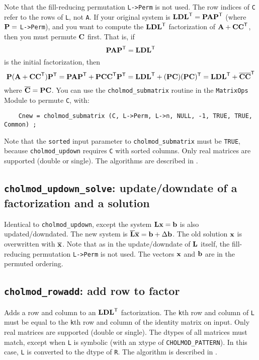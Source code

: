 \documentclass[11pt]{article}
\newcommand{\m}[1]{{\bf{#1}}}       %
\newcommand{\tr}{^{\sf T}}          %
\newcommand{\new}[1]{\overline{#1}}
\begin{document}
Note that the fill-reducing permutation {\tt L->Perm} is not used.  The row
indices of {\tt C} refer to the rows of {\tt L}, not {\tt A}.  If your original
system is $\m{LDL}\tr = \m{PAP}\tr$ (where $\m{P} =$ {\tt L->Perm}), and you
want to compute the $\m{LDL}\tr$ factorization of $\m{A}+\m{CC}\tr$, then you
must permute $\m{C}$ first.  That is, if
\[
    \m{PAP}\tr = \m{LDL}\tr
\]
is the initial factorization, then
\[
\m{P}(\m{A}+\m{CC}\tr)\m{P}\tr
    = \m{PAP}\tr+\m{PCC}\tr\m{P}\tr
    = \m{LDL}\tr + (\m{PC})(\m{PC})\tr
    = \m{LDL}\tr + \new{\m{C}}\new{\m{C}}\tr
\]
where $\new{\m{C}} = \m{PC}$.  You can use the {\tt cholmod\_submatrix} routine
in the {\tt MatrixOps} Module to permute {\tt C}, with:
\begin{verbatim}
    Cnew = cholmod_submatrix (C, L->Perm, L->n, NULL, -1, TRUE, TRUE, Common) ;
\end{verbatim}
Note that the {\tt sorted} input parameter to {\tt cholmod\_submatrix} must be
{\tt TRUE}, because {\tt cholmod\_updown} requires {\tt C} with sorted columns.
Only real matrices are supported (double or single).  The algorithms are
described in \cite{DavisHager99,DavisHager01}.

\subsection{{\tt cholmod\_updown\_solve}: update/downdate of a factorization
and a solution}


Identical to {\tt cholmod\_updown}, except the system $\m{Lx}=\m{b}$ is also
updated/downdated.  The new system is $\new{\m{L}}\new{\m{x}}=\m{b} + \Delta
\m{b}$.  The old solution $\m{x}$ is overwritten with $\new{\m{x}}$.  Note that
as in the update/downdate of $\m{L}$ itself, the fill-reducing permutation
{\tt L->Perm} is not used.  The vectors $\m{x}$ and $\m{b}$ are in the permuted
ordering.

\subsection{{\tt cholmod\_rowadd}: add row to factor}


Adds a row and column to an $\m{LDL}\tr$ factorization.  The {\tt k}th row and
column of {\tt L} must be equal to the {\tt k}th row and column of the identity
matrix on input.  Only real matrices are supported (double or single).  The
dtypes of all matrices must match, except when \verb'L' is symbolic (with an
xtype of \verb'CHOLMOD_PATTERN').  In this case, \verb'L' is converted to the
dtype of \verb'R'.  The algorithm is described in \cite{DavisHager05}.
\end{document}
